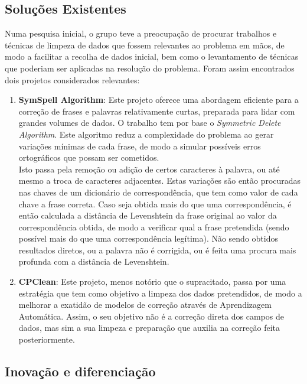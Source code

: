 \documentclass[a4paper,12pt]{article}
\begin{document}
\subsection{Soluções Existentes}
Numa pesquisa inicial, o grupo teve a preocupação de procurar trabalhos e técnicas de limpeza de dados que fossem relevantes ao problema em mãos, de modo a facilitar a recolha de dados inicial, bem como o levantamento de técnicas que poderiam ser aplicadas na resolução do problema. Foram assim encontrados dois projetos considerados relevantes:

\begin{enumerate}
    \item \textbf{SymSpell Algorithm}\cite{symspell2025}:
    Este projeto oferece uma abordagem eficiente para a correção de frases e palavras relativamente curtas, preparada para lidar com grandes volumes de dados. O trabalho tem por base o \textit{Symmetric Delete Algorithm}. Este algoritmo reduz a complexidade do problema ao gerar variações mínimas de cada frase, de modo a simular possíveis erros ortográficos que possam ser cometidos.\\
    Isto passa pela remoção ou adição de certos caracteres à palavra, ou até mesmo a troca de caracteres adjacentes. Estas variações são então procuradas nas chaves de um dicionário de correspondência, que tem como valor de cada chave a frase correta. Caso seja obtida mais do que uma correspondência, é então calculada a distância de Levenshtein da frase original ao valor da correspondência obtida, de modo a verificar qual a frase pretendida (sendo possível mais do que uma correspondência legítima). Não sendo obtidos resultados diretos, ou a palavra não é corrigida, ou é feita uma procura mais profunda com a distância de Levenshtein.

    \item \textbf{CPClean}\cite{cpclean2021}:
    Este projeto, menos notório que o supracitado, passa por uma estratégia que tem como objetivo a limpeza dos dados pretendidos, de modo a melhorar a exatidão de modelos de correção através de Aprendizagem Automática. Assim, o seu objetivo não é a correção direta dos campos de dados, mas sim a sua limpeza e preparação que auxilia na correção feita posteriormente.
\end{enumerate}

\subsection{Inovação e diferenciação}
\end{document}
